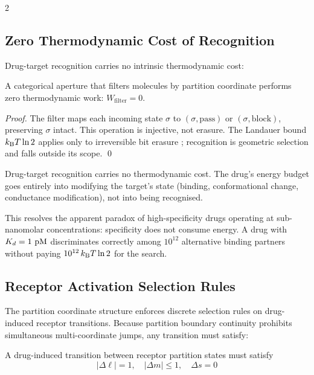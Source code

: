 \begin{multicols}{2}

\subsection{Zero Thermodynamic Cost of Recognition}

Drug-target recognition carries no intrinsic thermodynamic cost:

\begin{theorem}
\label{thm:ch12_zerowork}
A categorical aperture that filters molecules by partition coordinate performs zero thermodynamic work: $W_{\mathrm{filter}} = 0$.
\end{theorem}

\begin{proof}
The filter maps each incoming state $\sigma$ to $(\sigma, \mathrm{pass})$ or $(\sigma, \mathrm{block})$, preserving $\sigma$ intact. This operation is injective, not erasure. The Landauer bound $k_{\mathrm{B}} T\ln 2$ applies only to irreversible bit erasure \citep{landauer_1961}; recognition is geometric selection and falls outside its scope. \qed
\end{proof}

\begin{corollary}
Drug-target recognition carries no thermodynamic cost. The drug's energy budget goes entirely into modifying the target's state (binding, conformational change, conductance modification), not into being recognised.
\end{corollary}

This resolves the apparent paradox of high-specificity drugs operating at sub-nanomolar concentrations: specificity does not consume energy. A drug with $\Kd = 1\ \mathrm{pM}$ discriminates correctly among $10^{12}$ alternative binding partners without paying $10^{12}\,k_{\mathrm{B}} T\ln 2$ for the search.

\subsection{Receptor Activation Selection Rules}

The partition coordinate structure enforces discrete selection rules on drug-induced receptor transitions. Because partition boundary continuity prohibits simultaneous multi-coordinate jumps, any transition must satisfy:

\begin{theorem}
\label{thm:ch12_selection}
A drug-induced transition between receptor partition states must satisfy
\begin{equation}
|\Delta\ell| = 1, \quad |\Delta m| \leq 1, \quad \Delta s = 0
\label{eq:ch12_selection}
\end{equation}
\end{theorem}


\end{multicols}
